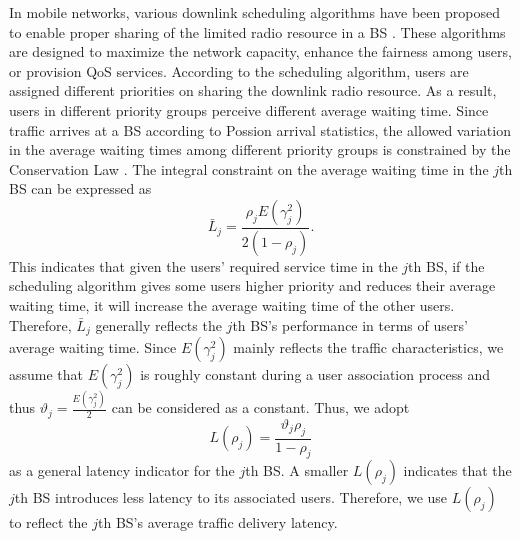 \documentclass[journal]{IEEEtran}
\theoremstyle{definition}
\begin{document}
In mobile networks, various downlink scheduling algorithms have been proposed to enable proper sharing of the limited radio resource in a BS \cite{Capozzi:2013:DPS}. These algorithms are designed to maximize the network capacity, enhance the fairness among users, or provision QoS services. According to the scheduling algorithm, users are assigned different priorities on sharing the downlink radio resource. As a result, users in different priority groups perceive different average waiting time. Since traffic arrives at a BS according to Possion arrival statistics, the allowed variation in the average waiting times among different priority groups is constrained by the Conservation Law \cite{Kleinrock:1976:QS}. The integral constraint on the average waiting time in the $j$th BS can be expressed as
\begin{equation}
\label{eq:conservation_law}
\bar{L}_{j}=\frac{\rho_{j}E(\gamma_{j}^{2})}{2(1-\rho_{j})}.
\end{equation}
This indicates that given the users' required service time in the $j$th BS, if the scheduling algorithm gives some users higher priority and reduces their average waiting time, it will increase the average waiting time of the other users. Therefore, $\bar{L}_{j}$ generally reflects the $j$th BS's performance in terms of users' average waiting time. 
Since $E(\gamma_{j}^{2})$ mainly reflects the traffic characteristics, we assume that $E(\gamma_{j}^{2})$ is roughly constant during a user association process and thus $\vartheta_{j}=\frac{E(\gamma_{j}^{2})}{2}$ can be considered as a constant. Thus, we adopt
\begin{equation}
\label{eq:latency_indicator}
L(\rho_{j})=\frac{\vartheta_{j}\rho_{j}}{1-\rho_{j}}
\end{equation}
as a general latency indicator for the $j$th BS. A smaller $L(\rho_{j})$ indicates that the $j$th BS introduces less latency to its associated users. Therefore, we use $L(\rho_{j})$ to reflect the $j$th BS's average traffic delivery latency.
\end{document}
